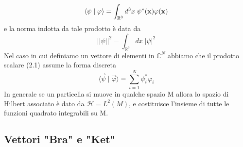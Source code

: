 \begin{equation}
	\langle \psi \;|\; \varphi \rangle = \int_{\mathbb{R}^3}d^3x \; \psi^*(\bold{x})\varphi(\bold{x})
\end{equation}
e la norma indotta da tale prodotto \`e data da
\begin{equation*}
	||\psi||^2 = \int_{\mathbb{R}^3} dx \; |\psi|^2
\end{equation*}
Nel caso in cui definiamo un vettore di elementi in $\mathbb{C}^N$ abbiamo che il prodotto scalare (2.1) assume la forma discreta 
\begin{equation}
	\langle \vec{\psi} \;|\; \vec{\varphi}\rangle = \sum_{i=1}^N \psi_i^*\varphi_i
\end{equation}
In generale se un particella si muove in qualche spazio M allora lo spazio di Hilbert associato \`e dato da $\mathcal{H} = L^2(M)$, e costituisce l'insieme di tutte le funzioni quadrato integrabili su M.


\subsection{Vettori "Bra" e "Ket"}


